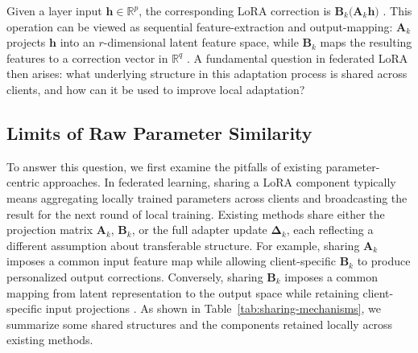 \documentclass[11pt,letterpaper]{article}
\newcommand{\R}{\mathbb{R}}
\newcommand{\bA}{\mathbf{A}}
\newcommand{\bB}{\mathbf{B}}
\newcommand{\bDelta}{\boldsymbol{\Delta}}
\newcommand{\bh}{\mathbf{h}}
\begin{document}
Given a layer input $\bh\in\R^p$, the corresponding LoRA correction is $\bB_k\bigl(\bA_k\bh\bigr)$ \citep{hu2022lora}. This operation can be viewed as sequential feature-extraction and output-mapping: $\bA_k$ projects $\bh$ into an $r$-dimensional latent feature space, while $\bB_k$ maps the resulting features to a correction vector in $\R^q$ \citep{zhu2024asymmetry}. 
A fundamental question in federated LoRA then arises: what underlying  structure in this adaptation process is shared across clients,  and how can it be used to improve local
adaptation? 

\subsection{Limits of Raw Parameter Similarity}\label{sec:factor similarity}
To answer this question, we first examine the pitfalls of existing parameter-centric approaches. In federated learning, sharing a LoRA component typically means aggregating locally trained parameters across clients and broadcasting the result for the next round of local training. Existing methods share either the projection matrix $\bA_k$,  $\bB_k$, or the full adapter update $\bDelta_k$, each reflecting a different assumption about transferable structure. For example, sharing $\bA_k$ imposes a common input feature map while allowing client-specific $\bB_k$ to produce personalized output corrections.
Conversely, sharing $\bB_k$ imposes a common mapping from latent representation to the output space while retaining client-specific input projections \citep{sun2024improving}. As shown in Table~\ref{tab:sharing-mechanisms}, we summarize some shared structures and the components retained locally across existing methods.
\end{document}
